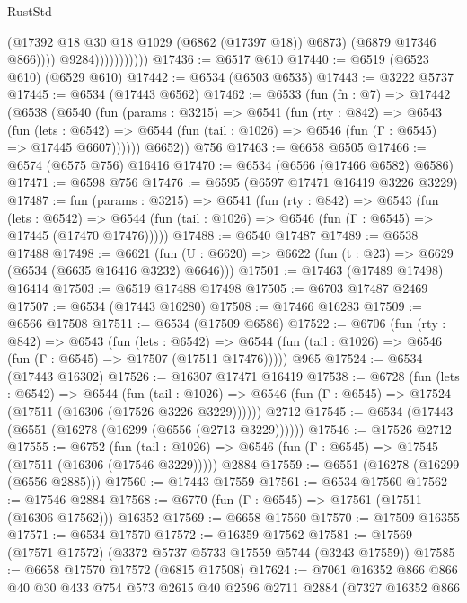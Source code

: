\begin{lexlean}{RustStd}
\begin{coremodule}
                                (@17392 @18 @30 @18 @1029 (@6862 (@17397 @18)) @6873)
                                (@6879 @17346 @866))))
                          @9284)))))))))))
@17436 := @6517 @610
@17440 := @6519 (@6523 @610) (@6529 @610)
@17442 := @6534 (@6503 @6535)
@17443 := @3222 @5737
@17445 := @6534 (@17443 @6562)
@17462 := @6533
    (fun (fn : @7) =>
    @17442
      (@6538
        (@6540
          (fun (params : @3215) =>
          @6541
            (fun (rty : @842) =>
            @6543
              (fun (lets : @6542) =>
              @6544 (fun (tail : @1026) => @6546 (fun (Γ : @6545) => @17445 @6607))))))
        @6652))
    @756
@17463 := @6658 @6505
@17466 := @6574 (@6575 @756) @16416
@17470 := @6534 (@6566 (@17466 @6582) @6586)
@17471 := @6598 @756
@17476 := @6595 (@6597 @17471 @16419 @3226 @3229)
@17487 := fun (params : @3215) =>
  @6541
    (fun (rty : @842) =>
    @6543
      (fun (lets : @6542) =>
      @6544 (fun (tail : @1026) => @6546 (fun (Γ : @6545) => @17445 (@17470 @17476)))))
@17488 := @6540 @17487
@17489 := @6538 @17488
@17498 := @6621
    (fun (U : @6620) => @6622 (fun (t : @23) => @6629 (@6534 (@6635 @16416 @3232) @6646)))
@17501 := @17463 (@17489 @17498) @16414
@17503 := @6519 @17488 @17498
@17505 := @6703 @17487 @2469
@17507 := @6534 (@17443 @16280)
@17508 := @17466 @16283
@17509 := @6566 @17508
@17511 := @6534 (@17509 @6586)
@17522 := @6706
    (fun (rty : @842) =>
    @6543
      (fun (lets : @6542) =>
      @6544 (fun (tail : @1026) => @6546 (fun (Γ : @6545) => @17507 (@17511 @17476)))))
    @965
@17524 := @6534 (@17443 @16302)
@17526 := @16307 @17471 @16419
@17538 := @6728
    (fun (lets : @6542) =>
    @6544
      (fun (tail : @1026) =>
      @6546 (fun (Γ : @6545) => @17524 (@17511 (@16306 (@17526 @3226 @3229))))))
    @2712
@17545 := @6534 (@17443 (@6551 (@16278 (@16299 (@6556 (@2713 @3229))))))
@17546 := @17526 @2712
@17555 := @6752
    (fun (tail : @1026) => @6546 (fun (Γ : @6545) => @17545 (@17511 (@16306 (@17546 @3229)))))
    @2884
@17559 := @6551 (@16278 (@16299 (@6556 @2885)))
@17560 := @17443 @17559
@17561 := @6534 @17560
@17562 := @17546 @2884
@17568 := @6770 (fun (Γ : @6545) => @17561 (@17511 (@16306 @17562))) @16352
@17569 := @6658 @17560
@17570 := @17509 @16355
@17571 := @6534 @17570
@17572 := @16359 @17562
@17581 := @17569 (@17571 @17572) (@3372 @5737 @5733 @17559 @5744 (@3243 @17559))
@17585 := @6658 @17570 @17572 (@6815 @17508)
@17624 := @7061
    @16352
    @866
    @866
    @40
    @30
    @433
    @754
    @573
    @2615
    @40
    @2596
    @2711
    @2884
    (@7327
      @16352
      @866

\end{coremodule}
\end{lexlean}
